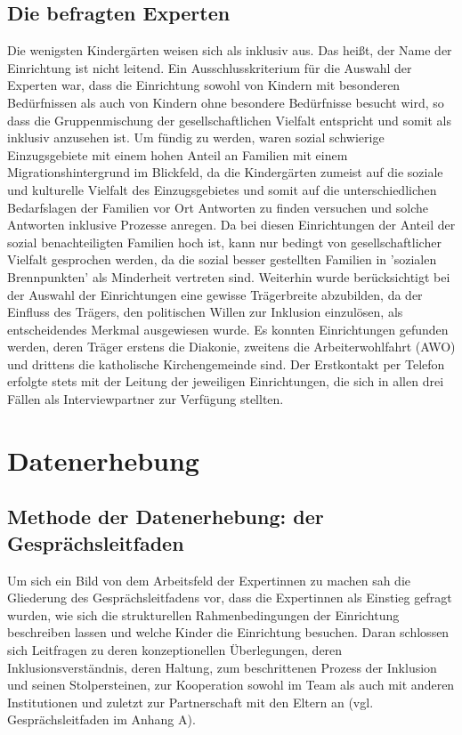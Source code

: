 \subsection{Die befragten Experten}
Die wenigsten Kindergärten weisen sich als inklusiv aus. Das heißt, der Name der Einrichtung ist nicht leitend. Ein Ausschlusskriterium für die Auswahl der Experten war, dass die Einrichtung sowohl von Kindern mit besonderen Bedürfnissen als auch von Kindern ohne besondere Bedürfnisse besucht wird, so dass die Gruppenmischung der gesellschaftlichen Vielfalt entspricht und somit als inklusiv anzusehen ist. Um fündig zu werden, waren sozial schwierige Einzugsgebiete mit einem hohen Anteil an Familien mit einem Migrationshintergrund im Blickfeld, da die Kindergärten zumeist auf die soziale und kulturelle Vielfalt des Einzugsgebietes und somit auf die unterschiedlichen Bedarfslagen der Familien vor Ort Antworten zu finden versuchen und solche Antworten inklusive Prozesse anregen. Da bei diesen Einrichtungen der Anteil der sozial benachteiligten Familien hoch ist, kann nur bedingt von gesellschaftlicher Vielfalt gesprochen werden, da die sozial besser gestellten Familien in ’sozialen Brennpunkten’ als Minderheit vertreten sind.    
Weiterhin wurde berücksichtigt bei der Auswahl der Einrichtungen eine gewisse Trägerbreite abzubilden, da der Einfluss des Trägers, den politischen Willen zur Inklusion einzulösen, als entscheidendes Merkmal ausgewiesen wurde. Es konnten Einrichtungen gefunden werden, deren Träger erstens die Diakonie, zweitens die Arbeiterwohlfahrt (AWO) und drittens die katholische Kirchengemeinde sind. Der Erstkontakt per Telefon erfolgte stets mit der Leitung der jeweiligen Einrichtungen, die sich in allen drei Fällen als Interviewpartner zur Verfügung stellten.

\section{Datenerhebung}
\subsection{Methode der Datenerhebung: der Gesprächsleitfaden}
Um sich ein Bild von dem Arbeitsfeld der Expertinnen zu machen sah die Gliederung des Gesprächsleitfadens vor, dass die Expertinnen als Einstieg gefragt wurden, wie sich die strukturellen Rahmenbedingungen der Einrichtung beschreiben lassen und welche Kinder die Einrichtung besuchen. Daran schlossen sich Leitfragen zu deren konzeptionellen Überlegungen, deren Inklusionsverständnis, deren Haltung, zum beschrittenen Prozess der Inklusion und seinen Stolpersteinen, zur Kooperation sowohl im Team als auch mit anderen Institutionen und zuletzt zur Partnerschaft mit den Eltern an (vgl. Gesprächsleitfaden im Anhang A).

